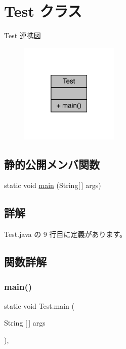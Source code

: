 \hypertarget{class_test}{}\section{Test クラス}
\label{class_test}


Test 連携図\nopagebreak
\begin{figure}[H]
\begin{center}
\leavevmode
\includegraphics[width=133pt]{dd/d5e/class_test__coll__graph}
\end{center}
\end{figure}
\subsection*{静的公開メンバ関数}
\begin{DoxyCompactItemize}
\item 
static void \mbox{\hyperlink{class_test_ad91b01698e99c4a022d21159dd694250}{main}} (String\mbox{[}$\,$\mbox{]} args)
\end{DoxyCompactItemize}


\subsection{詳解}


 Test.\+java の 9 行目に定義があります。



\subsection{関数詳解}
\mbox{\label{class_test_ad91b01698e99c4a022d21159dd694250}} 
\subsubsection{\texorpdfstring{main()}{main()}}
{\footnotesize\ttfamily static void Test.\+main (\begin{DoxyParamCaption}\item[{String \mbox{[}$\,$\mbox{]}}]{args }\end{DoxyParamCaption})\hspace{0.3cm}{\ttfamily [inline]}, {\ttfamily [static]}}



